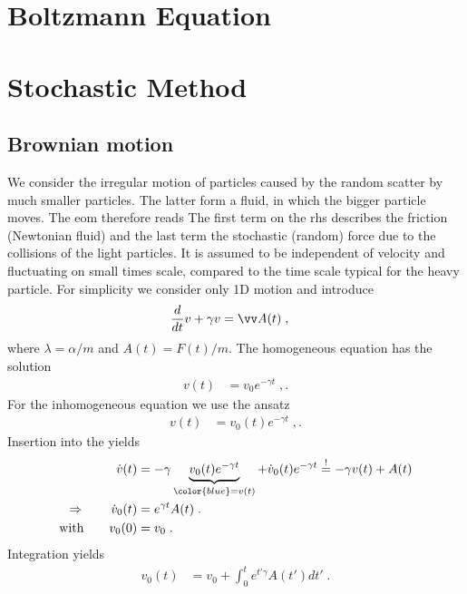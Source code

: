 \section{Boltzmann Equation}
\section{Stochastic Method}
\subsection{Brownian motion}

We consider the irregular motion of particles
caused by the random scatter by much smaller particles. The latter form a fluid, in which the bigger
particle moves. The eom therefore reads
%
%
The first term on the rhs describes the friction (Newtonian fluid) and the last term the
stochastic (random) force due to the collisions of the light particles. It is assumed to be independent of velocity and fluctuating on small times scale, compared to the time scale typical for the heavy particle.
For simplicity we consider only 1D motion and introduce
%
\begin{align}\label{eq:Langevin:1d}
 \frac{d}{dt} v + \gamma v&=  \vv A(t)\;,
\end{align}
%
where $\lambda=\alpha/m$ and $A(t) = F(t)/m$. The homogeneous equation has the solution
%
\begin{align*}
v(t) &= v_{0} e^{-\gamma t}\;,.
\end{align*}
%
For the inhomogeneous equation we use the ansatz
\begin{align*}
v(t) &= v_{0}(t) e^{-\gamma t}\;,.
\end{align*}
%
Insertion into the  yields
\begin{align*}
\dot v(t) &= -\gamma \underbrace{
v_{0}(t) e^{-\gamma t}
}_{\color{blue} = v(t)} + \dot v_{0}(t) e^{-\gamma t} 
\overset{!}{=} - \gamma v(t) + A(t)\\
\Rightarrow\qquad \dot v_{0}(t) &=e^{\gamma t}  A(t)\;.\\
\text{with}\qquad v_{0}(0) &=v_{0}\;.
\end{align*}
Integration yields
%
\begin{align*}
v_{0}(t) &= v_{0} + \int_{0}^{t} e^{t' \gamma} A(t') dt'\;.
\end{align*}

